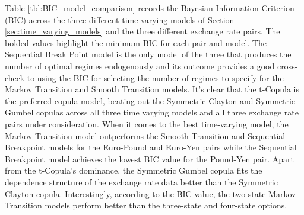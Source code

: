 \documentclass[12pt]{article}
\begin{document}
Table \ref{tbl:BIC_model_comparison} records the Bayesian Information Criterion (BIC) across the three different time-varying models of Section \ref{sec:time_varying_models} and the three different exchange rate pairs. The bolded values highlight the minimum BIC for each pair and model. The Sequential Break Point model is the only model of the three that produces the number of optimal regimes endogenously and its outcome provides a good cross-check to using the BIC for selecting the number of regimes to specify for the Markov Transition and Smooth Transition models. It's clear that the t-Copula is the preferred copula model, beating out the Symmetric Clayton and Symmetric Gumbel copulas across all three time varying models and all three exchange rate pairs under consideration. When it comes to the best time-varying model, the Markov Transition model outperforms the Smooth Transition and Sequential Breakpoint models for the Euro-Pound and Euro-Yen pairs while the Sequential Breakpoint model achieves the lowest BIC value for the Pound-Yen pair. Apart from the t-Copula's dominance, the Symmetric Gumbel copula fits the dependence structure of the exchange rate data better than the Symmetric Clayton copula. Interestingly, according to the BIC value, the two-state Markov Transition models perform better than the three-state and four-state options.
\end{document}
